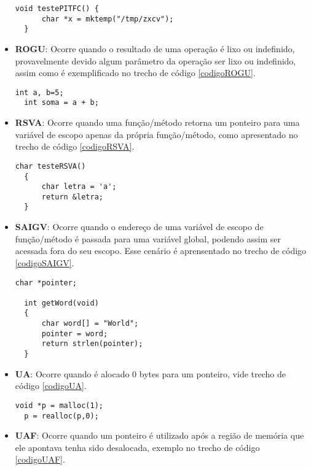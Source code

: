 \begin{itemize}
    \begin{lstlisting}[caption={Código exemplo PITFC}, label=codigoPITFC]
  void testePITFC() {
      char *x = mktemp("/tmp/zxcv"); 
  }
    \end{lstlisting}
  \item \textbf{ROGU}: Ocorre quando o resultado de uma operação é lixo ou indefinido, provavelmente devido algum parâmetro da 
    operação ser lixo ou indefinido, assim como é exemplificado no trecho de código \ref{codigoROGU}.

    \begin{lstlisting}[caption={Código exemplo ROGU}, label=codigoROGU]
  int a, b=5;
  int soma = a + b;
    \end{lstlisting}
  \item \textbf{RSVA}: Ocorre quando uma função/método retorna um ponteiro para uma variável de escopo apenas da própria 
    função/método, como apresentado no trecho de código \ref{codigoRSVA}.

    \begin{lstlisting}[caption={Código exemplo RSVA}, label=codigoRSVA]
  char testeRSVA()
  {
      char letra = 'a';
      return &letra;
  }
    \end{lstlisting}
  \item \textbf{SAIGV}: Ocorre quando o endereço de uma variável de escopo de função/método é passada para uma variável global, 
    podendo assim ser acessada fora do seu escopo. Esse cenário é aprensentado no trecho de código \ref{codigoSAIGV}.

    \begin{lstlisting}[caption={Código exemplo SAIGV}, label=codigoSAIGV]
  char *pointer;

  int getWord(void)
  {
      char word[] = "World";
      pointer = word;
      return strlen(pointer);
  }
    \end{lstlisting}
  \item \textbf{UA}: Ocorre quando é alocado 0 bytes para um ponteiro, vide trecho de código \ref{codigoUA}.

    \begin{lstlisting}[caption={Código exemplo UA}, label=codigoUA]
  void *p = malloc(1);
  p = realloc(p,0);
    \end{lstlisting}
  \item \textbf{UAF}: Ocorre quando um ponteiro é utilizado após a região de memória que ele apontava tenha sido desalocada, 
    exemplo no trecho de código \ref{codigoUAF}.


\end{itemize}
